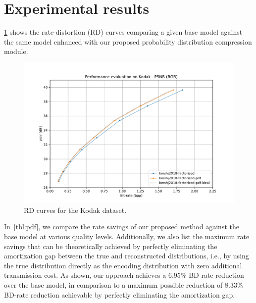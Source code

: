 \section{Experimental results}
\label{sec:pdf_compression/experimental_results}

\cref{fig:pdf/rd-curves} shows the rate-distortion (RD) curves comparing a given base model against the same model enhanced with our proposed probability distribution compression module.


\begin{figure}[htbp]
  \centering
  \includegraphics[width=\linewidth]{img/pdf_compression/rd-curves-kodak-psnr-bmshj2018-factorized.pdf}
  \caption[RD curves for Kodak dataset]{%
    RD curves for the Kodak dataset.%
  }
  \label{fig:pdf/rd-curves}
\end{figure}


In~\cref{tbl:pdf}, we compare the rate savings of our proposed method against the base model at various quality levels.
Additionally, we also list the maximum rate savings that can be theoretically achieved by perfectly eliminating the amortization gap between the true and reconstructed distributions, i.e., by using the true distribution directly as the encoding distribution with zero additional transmission cost.
As shown, our approach achieves a 6.95\% BD-rate reduction over the base model, in comparison to a maximum possible reduction of 8.33\% BD-rate reduction achievable by perfectly eliminating the amortization gap.


%


